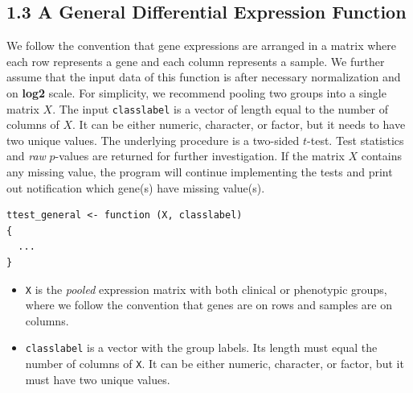 \documentclass[a4paper, 11pt]{article}
\begin{document}
\subsection*{1.3 A General Differential Expression Function}
We follow the convention that gene expressions are arranged in a matrix where each row represents a gene and each column represents a sample. We further assume that the input data of this function is after necessary normalization and on \textbf{log2} scale. For simplicity, we recommend pooling two groups into a single matrix $X$. The input \texttt{classlabel} is a vector of length equal to the number of columns of $X$. It can be either numeric, character, or factor, but it needs to have two unique values. The underlying procedure is a two-sided $t$-test. Test statistics and \textit{raw} $p$-values are returned for further investigation. If the matrix $X$ contains any missing value, the program will continue implementing the tests and print out notification which gene(s) have missing value(s).
\begin{verbatim}
ttest_general <- function (X, classlabel) 
{
  ...
}
\end{verbatim}
\begin{itemize}
\item \texttt{X} is the \textit{pooled} expression matrix with both clinical or phenotypic groups, where we follow the convention that genes are on rows and samples are on columns.
\item \texttt{classlabel} is a vector with the group labels. Its length must equal the number of columns of \texttt{X}. It can be either numeric, character, or factor, but it must have two unique values.
\end{itemize}
\end{document}
